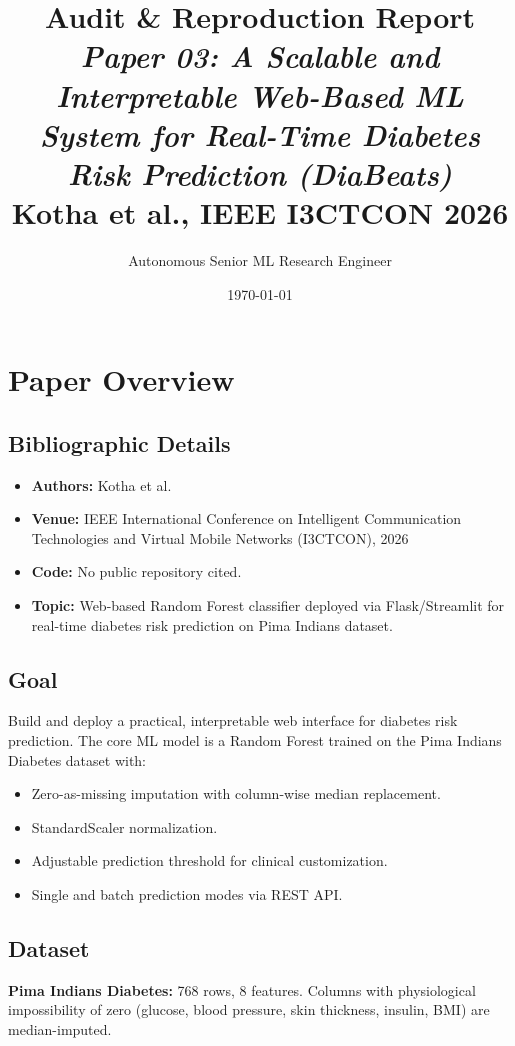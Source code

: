 \documentclass[12pt,a4paper]{article}
\title{\textbf{Audit \& Reproduction Report}\\[0.4em]
\large\textit{Paper 03: A Scalable and Interpretable Web-Based ML System for Real-Time Diabetes Risk Prediction (DiaBeats)}\\[0.3em]
Kotha et al., IEEE I3CTCON 2026}
\author{Autonomous Senior ML Research Engineer}
\date{\today}
\begin{document}
\maketitle
\tableofcontents
\newpage

\section{Paper Overview}
\subsection{Bibliographic Details}
\begin{itemize}[leftmargin=*]
  \item \textbf{Authors:} Kotha et al.
  \item \textbf{Venue:} IEEE International Conference on Intelligent Communication Technologies and Virtual Mobile Networks (I3CTCON), 2026
  \item \textbf{Code:} No public repository cited.
  \item \textbf{Topic:} Web-based Random Forest classifier deployed via Flask/Streamlit for real-time diabetes risk prediction on Pima Indians dataset.
\end{itemize}

\subsection{Goal}
Build and deploy a practical, interpretable web interface for diabetes risk prediction. The core ML model is a Random Forest trained on the Pima Indians Diabetes dataset with:
\begin{itemize}[leftmargin=*]
  \item Zero-as-missing imputation with column-wise median replacement.
  \item StandardScaler normalization.
  \item Adjustable prediction threshold for clinical customization.
  \item Single and batch prediction modes via REST API.
\end{itemize}

\subsection{Dataset}
\textbf{Pima Indians Diabetes:} 768 rows, 8 features. Columns with physiological impossibility of zero (glucose, blood pressure, skin thickness, insulin, BMI) are median-imputed.
\end{document}
